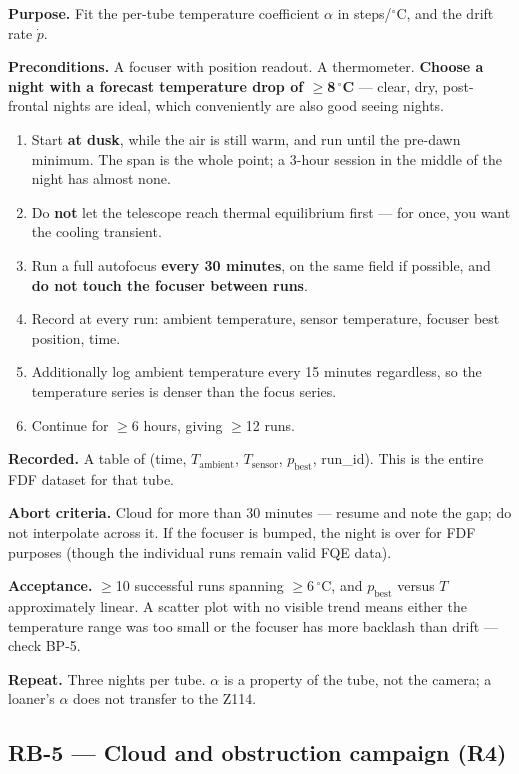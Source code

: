 \documentclass[11pt]{article}
\begin{document}
\textbf{Purpose.} Fit the per-tube temperature coefficient
$\alpha$ in steps/$^\circ$C, and the drift rate $\dot p$.

\textbf{Preconditions.} A focuser with position readout. A thermometer.
\textbf{Choose a night with a forecast temperature drop of $\geq$8\,$^\circ$C}
--- clear, dry, post-frontal nights are ideal, which conveniently are also good
seeing nights.

\begin{enumerate}
\item Start \textbf{at dusk}, while the air is still warm, and run until the
      pre-dawn minimum. The span is the whole point; a 3-hour session in the
      middle of the night has almost none.
\item Do \textbf{not} let the telescope reach thermal equilibrium first --- for
      once, you want the cooling transient.
\item Run a full autofocus \textbf{every 30 minutes}, on the same field if
      possible, and \textbf{do not touch the focuser between runs}.
\item Record at every run: ambient temperature, sensor temperature, focuser
      best position, time.
\item Additionally log ambient temperature every 15 minutes regardless, so the
      temperature series is denser than the focus series.
\item Continue for $\geq$6 hours, giving $\geq$12 runs.
\end{enumerate}

\textbf{Recorded.} A table of (time, $T_{\mathrm{ambient}}$,
$T_{\mathrm{sensor}}$, $p_{\mathrm{best}}$, run\_id). This is the entire FDF
dataset for that tube.

\textbf{Abort criteria.} Cloud for more than 30 minutes --- resume and note the
gap; do not interpolate across it. If the focuser is bumped, the night is over
for FDF purposes (though the individual runs remain valid FQE data).

\textbf{Acceptance.} $\geq$10 successful runs spanning $\geq$6\,$^\circ$C,
and $p_{\mathrm{best}}$ versus $T$ approximately linear. A scatter plot with no
visible trend means either the temperature range was too small or the focuser
has more backlash than drift --- check BP-5.

\textbf{Repeat.} Three nights per tube. $\alpha$ is a property of the tube, not
the camera; a loaner's $\alpha$ does not transfer to the Z114.

\subsection*{RB-5 --- Cloud and obstruction campaign (R4)}
\end{document}
